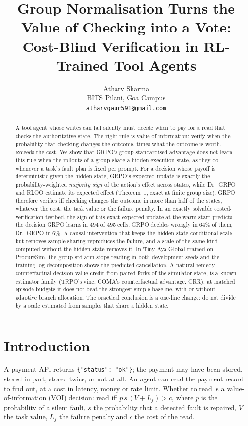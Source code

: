 \documentclass[11pt]{article}
\title{Group Normalisation Turns the Value of Checking into a Vote:\\Cost-Blind Verification in RL-Trained Tool Agents}
\author{Atharv Sharma \\
  BITS Pilani, Goa Campus \\
  \texttt{atharvgaur591@gmail.com}}
\begin{document}
\maketitle

\begin{abstract}
A tool agent whose writes can fail silently must decide when to pay for a read that checks the authoritative state.
The right rule is value of information: verify when the probability that checking changes the outcome, times what
the outcome is worth, exceeds the cost. We show that GRPO's group-standardised advantage does not learn this rule
when the rollouts of a group share a hidden execution state, as they do whenever a task's fault plan is fixed per
prompt. For a decision whose payoff is deterministic given the hidden state, GRPO's expected update is exactly the
probability-weighted \emph{majority sign} of the action's effect across states, while Dr.~GRPO and RLOO estimate its
expected effect (Theorem~1, exact at finite group size). GRPO therefore verifies iff checking changes the outcome in
more than half of the states, whatever the cost, the task value or the failure penalty. In an exactly solvable
costed-verification testbed, the sign of this exact expected update at the warm start predicts the decision GRPO
learns in 494 of 495 cells; GRPO decides wrongly in 64\% of them, Dr.~GRPO in 6\%. A causal intervention that keeps
the hidden-state-conditional scale but removes sample sharing reproduces the failure, and a scale of the same kind
computed without the hidden state removes it. In Tiny Aya Global trained on ProcureSim, the group-std arm stops
reading in both development seeds and the training-log decomposition shows the predicted cancellation. A natural
remedy, counterfactual decision-value credit from paired forks of the simulator state, is a known estimator family
(TRPO's vine, COMA's counterfactual advantage, CRR); at matched episode budgets it does not beat the strongest simple
baseline, with or without adaptive branch allocation. The practical conclusion is a one-line change: do not divide
by a scale estimated from samples that share a hidden state.
\end{abstract}

\section{Introduction}

A payment API returns \texttt{\{"status": "ok"\}}; the payment may have been stored, stored in part, stored twice, or
not at all. An agent can read the payment record to find out, at a cost in latency, money or rate limit. Whether to
read is a value-of-information (VOI) decision: read iff $p\,s\,(V+L_f) > c$, where $p$ is the probability of a silent
fault, $s$ the probability that a detected fault is repaired, $V$ the task value, $L_f$ the failure penalty and $c$
the cost of the read.
\end{document}
